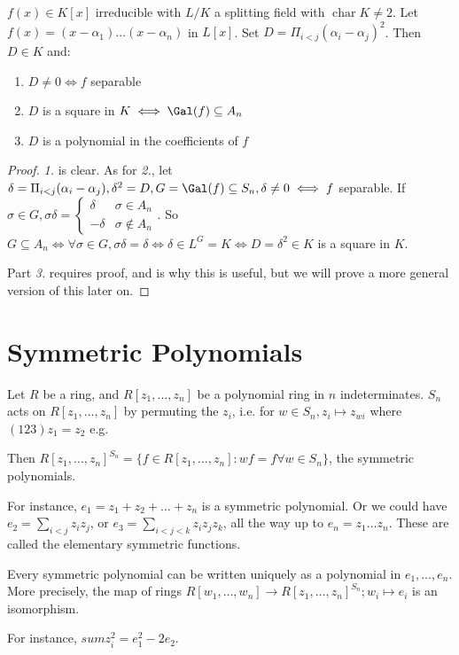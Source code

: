 \documentclass[a4paper, 10pt, twocolumn]{amsart}
\renewcommand{\charr}{\operatorname{char}}
\begin{document}
\begin{proposition}
$f(x) \in K[x]$ irreducible with $L/K$ a splitting field with $\charr K \neq 2$. Let $f(x) = (x-\alpha_1)\ldots(x-\alpha_n)$ in $L[x]$. Set $D = \Pi_{i<j} (\alpha_i - \alpha_j)^2$. Then $D \in K$ and:
\begin{enumerate}
\item $D \neq 0 \iff f$ separable
\item $D$ is a square in $K \iff \Gal(f) \subseteq A_n$
\item $D$ is a polynomial in the coefficients of $f$
\end{enumerate}
\end{proposition}
\begin{proof}
\textit{1.} is clear. As for \textit{2.}, let $\delta = \Pi_{i<j}(\alpha_i -\alpha_j), \delta^2 = D, G = \Gal(f) \subseteq S_n, \delta \neq 0 \iff f$ separable. If $\sigma \in G, \sigma \delta = \begin{cases} \delta & \sigma \in A_n \\ -\delta & \sigma \notin A_n \end{cases}$. So $G \subseteq A_n \iff \forall \sigma \in G, \sigma \delta = \delta \iff \delta \in L^G = K \iff D = \delta^2 \in K$ is a square in $K$.

Part \textit{3.} requires proof, and is why this is useful, but we will prove a more general version of this later on.
\end{proof}
\section{Symmetric Polynomials}
Let $R$ be a ring, and $R[z_1, \ldots, z_n]$ be a polynomial ring in $n$ indeterminates. $S_n$ acts on $R[z_1, \ldots, z_n]$ by permuting the $z_i$, i.e. for $w \in S_n, z_i \mapsto z_{wi}$ where $(123)z_1 = z_2$ e.g.

Then $R[z_1, \ldots, z_n]^{S_n} = \{f \in R[z_1, \ldots, z_n] : wf = f \forall w \in S_n\}$, the symmetric polynomials. 

For instance, $e_1 = z_1 + z_2 + \ldots + z_n$ is a symmetric polynomial. Or we could have $e_2 = \sum_{i<j} z_i z_j$, or $e_3 = \sum_{i<j<k} z_i z_j z_k$, all the way up to $e_n = z_1\ldots z_n$. These are called the elementary symmetric functions.

\begin{theorem}
Every symmetric polynomial can be written uniquely as a polynomial in $e_1, \ldots, e_n$. More precisely, the map of rings $R[w_1, \ldots, w_n] \to R[z_1, \ldots, z_n]^{S_n}; w_i \mapsto e_i$ is an isomorphism.
\end{theorem}
For instance, $sum z_i^2 = e_1^2 - 2e_2$.
\end{document}
